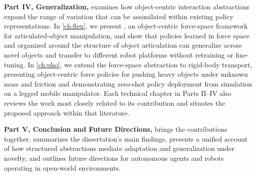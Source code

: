 \textbf{Part IV, Generalization,} examines how object-centric interaction abstractions expand the range of variation that can be assimilated within existing policy representations. In \cref{ch:flex}, we present \FLEX{}, an object-centric force-space framework for articulated-object manipulation, and show that policies learned in force space and organized around the structure of object articulation can generalize across novel objects and transfer to different robot platforms without retraining or fine-tuning. In \cref{ch:pho}, we extend the force-space abstraction to rigid-body transport, presenting object-centric force policies for pushing heavy objects under unknown mass and friction and demonstrating zero-shot policy deployment from simulation on a legged mobile manipulator. Each technical chapter in Parts II--IV also reviews the work most closely related to its contribution and situates the proposed approach within that literature.

\textbf{Part V, Conclusion and Future Directions,} brings the contributions together.  summarizes the dissertation's main findings, presents a unified account of how structured abstractions mediate adaptation and generalization under novelty, and outlines future directions for autonomous agents and robots operating in open-world environments.

